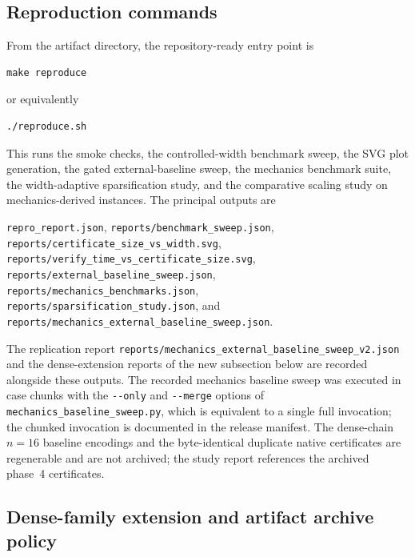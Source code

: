 \subsection{Reproduction commands}

From the artifact directory, the repository-ready entry point is
\begin{verbatim}
make reproduce
\end{verbatim}
or equivalently
\begin{verbatim}
./reproduce.sh
\end{verbatim}
This runs the smoke checks, the controlled-width benchmark sweep, the SVG plot
generation, the gated external-baseline sweep, the mechanics benchmark suite,
the width-adaptive sparsification study, and the comparative scaling study on
mechanics-derived instances. The principal outputs are
\begin{center}
\texttt{repro\_report.json}, \texttt{reports/benchmark\_sweep.json},\\
\texttt{reports/certificate\_size\_vs\_width.svg},\\
\texttt{reports/verify\_time\_vs\_certificate\_size.svg},\\
\texttt{reports/external\_baseline\_sweep.json},\\
\texttt{reports/mechanics\_benchmarks.json},\\
\texttt{reports/sparsification\_study.json}, and\\
\texttt{reports/mechanics\_external\_baseline\_sweep.json}.
\end{center}
The replication report
\texttt{reports/mechanics\_external\_baseline\_sweep\_v2.json} and the
dense-extension reports of the new subsection below are recorded
alongside these outputs.
The recorded mechanics baseline sweep was executed in case chunks with the
\texttt{-{}-only} and \texttt{-{}-merge} options of
\texttt{mechanics\_baseline\_sweep.py}, which is equivalent to a single full
invocation; the chunked invocation is documented in the release manifest. The
dense-chain $n=16$ baseline encodings and the byte-identical duplicate native
certificates are regenerable and are not archived; the study report references
the archived phase~4 certificates.

\subsection{Dense-family extension and artifact archive policy}

